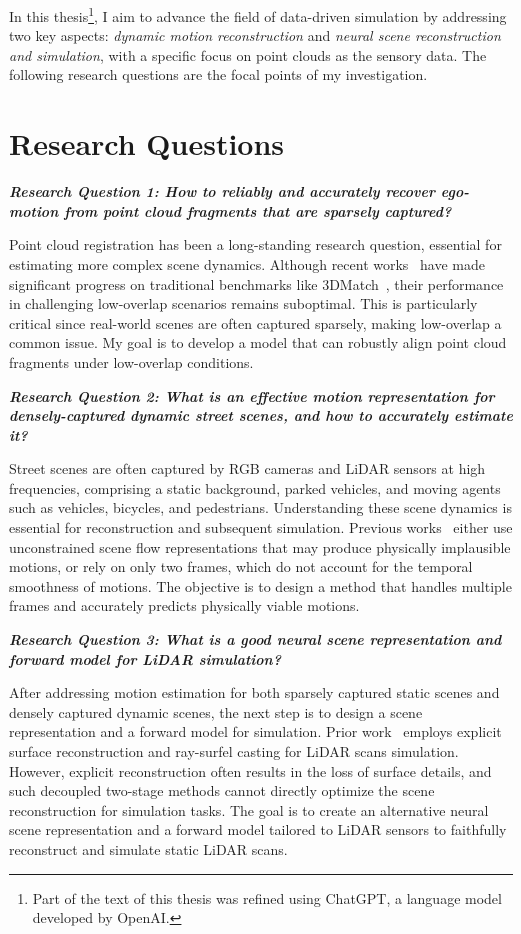 In this thesis\footnote{Part of the text of this thesis was refined using ChatGPT, a language model developed by OpenAI.}, I aim to advance the field of data-driven simulation by addressing two key aspects: \textit{dynamic motion reconstruction} and \textit{neural scene reconstruction and simulation}, with a specific focus on point clouds as the sensory data. The following research questions are the focal points of my investigation.

\section{Research Questions}
\noindent
\textbf{\textit{Research Question 1: How to reliably and accurately recover ego-motion from point cloud fragments that are sparsely captured?}}

Point cloud registration has been a long-standing research question, essential for estimating more complex scene dynamics. Although recent works~\cite{gojcic2018learned,Choy2019FCGF} have made significant progress on traditional benchmarks like 3DMatch~\cite{zeng20163dmatch}, their performance in challenging low-overlap scenarios remains suboptimal. This is particularly critical since real-world scenes are often captured sparsely, making low-overlap a common issue. My goal is to develop a model that can robustly align point cloud fragments under low-overlap conditions.

\noindent
\textbf{\textit{Research Question 2: What is an effective motion representation for densely-captured dynamic street scenes, and how to accurately estimate it?}}

Street scenes are often captured by RGB cameras and LiDAR sensors at high frequencies, comprising a static background, parked vehicles, and moving agents such as vehicles, bicycles, and pedestrians. Understanding these scene dynamics is essential for reconstruction and subsequent simulation. Previous works~\cite{li2020neural,gojcic2021weakly} either use unconstrained scene flow representations that may produce physically implausible motions, or rely on only two frames, which do not account for the temporal smoothness of motions. The objective is to design a method that handles multiple frames and accurately predicts physically viable motions.

\noindent
\textbf{\textit{Research Question 3: What is a good neural scene representation and forward model for LiDAR simulation?}}

After addressing motion estimation for both sparsely captured static scenes and densely captured dynamic scenes, the next step is to design a scene representation and a forward model for simulation. Prior work~\cite{manivasagam2020lidarsim} employs explicit surface reconstruction and ray-surfel casting for LiDAR scans simulation. However, explicit reconstruction often results in the loss of surface details, and such decoupled two-stage methods cannot directly optimize the scene reconstruction for simulation tasks. The goal is to create an alternative neural scene representation and a forward model tailored to LiDAR sensors to faithfully reconstruct and simulate static LiDAR scans.

